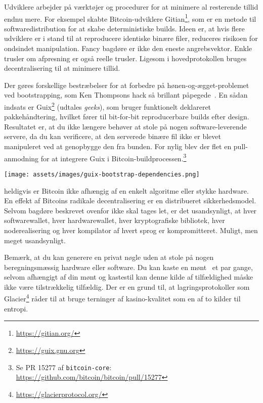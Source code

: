 Udviklere arbejder på værktøjer og procedurer for at minimere al resterende tillid
endnu mere. For eksempel skabte Bitcoin-udviklere
Gitian\footnote{\url{https://gitian.org/}}, som er en metode til softwaredistribution
for at skabe deterministiske builds. Ideen er, at hvis flere udviklere
er i stand til at reproducere identiske binære filer, reduceres risikoen for ondsindet manipulation.
Fancy bagdøre er ikke den eneste angrebsvektor. Enkle trusler om
afpresning er også reelle trusler. Ligesom i hovedprotokollen bruges decentralisering
til at minimere tillid.

Der gøres forskellige bestræbelser for at forbedre på hønen-og-ægget-problemet ved
bootstrapping, som Ken Thompsons hack så brillant påpegede~\cite{web:bootstrapping}. En sådan indsats er
Guix\footnote{\url{https://guix.gnu.org}} (udtales \textit{geeks}), som
bruger funktionelt deklareret pakkehåndtering, hvilket fører til bit-for-bit
reproducerbare builds efter design. Resultatet er, at du ikke længere behøver at stole på nogen
software-leverende servere, da du kan verificere, at den serverede binære fil
ikke er blevet manipuleret ved at genopbygge den fra bunden. For nylig blev der
flet en pull-anmodning for at integrere Guix i Bitcoin-buildprocessen.\footnote{Se PR 15277 af \texttt{bitcoin-core}: \\ \url{https://github.com/bitcoin/bitcoin/pull/15277}}

\begin{center}
  \texttt{[image: assets/images/guix-bootstrap-dependencies.png]}
  \label{fig:guix-bootstrap-dependencies}
\end{center}

 heldigvis er Bitcoin ikke afhængig af en enkelt algoritme eller stykke
hardware. En effekt af Bitcoins radikale decentralisering er en
distribueret sikkerhedsmodel. Selvom bagdøre beskrevet ovenfor ikke skal tages let,
er det usandsynligt, at hver softwarewallet,
hver hardwarewallet, hver kryptografiske bibliotek, hver noderealisering
og hver kompilator af hvert sprog er kompromitteret.
Muligt, men meget usandsynligt.

Bemærk, at du kan generere en privat nøgle uden at stole på nogen beregningsmæssig
hardware eller software. Du kan kaste en mønt~\cite{antonopoulos2014mastering} et
par gange, selvom afhængigt af din mønt og kastestil kan denne kilde
af tilfældighed måske ikke være tilstrækkelig tilfældig. Der er en grund til, at lagringsprotokoller som Glacier\footnote{\url{https://glacierprotocol.org/}} råder til
at bruge terninger af kasino-kvalitet som en af to kilder til entropi.

